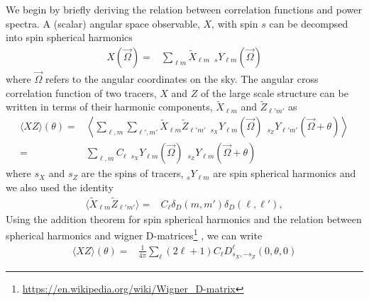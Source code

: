 \documentclass[\docopts]{\docclass}
\begin{document}
We begin by briefly deriving the relation between correlation functions and power spectra.
A (scalar) angular space observable, $X$, with spin $s$ can be decompsed into spin spherical
harmonics
\begin{align}\label{eq:X_harmonic}
  X(\vec \Omega)=&\sum_{\ell m}\tilde X_{\ell m} {\hspace{5pt}}_sY_{\ell m}(\vec \Omega)
\end{align}
where $\vec \Omega$ refers to the angular coordinates on the sky.
The angular cross correlation function of two tracers, $X$ and $Z$ of the large scale
structure can be written in terms of their harmonic components, $\tilde X_{\ell m}$ and $\tilde Z_{\ell' m'}$ as
\begin{align}
  \langle XZ \rangle(\theta)=&\left\langle\sum_{\ell,m}\sum_{\ell', m'}\tilde X_{\ell m}\tilde
  Z_{\ell' m'}{\hspace{5pt}}_{s_X}Y_{\ell m}(\vec \Omega){\hspace{5pt}}_{s_Z}Y_{\ell'm'}(\vec \Omega+\theta)\right\rangle\\
  =&\sum_{\ell,m}C_{\ell}{\hspace{5pt}}_{s_X}Y_{\ell m}(\vec \Omega){\hspace{5pt}}_{s_Z}Y_{\ell m}(\vec \Omega+\theta)%
\end{align}
where $s_X$ and $s_Z$ are the spins of tracers, $_{s}Y_{\ell m}$ are spin spherical harmonics and
we also used the identity
\begin{align}
  \langle\tilde X_{\ell m}\tilde Z_{\ell' m'}\rangle=&C_{\ell}\delta_D(m,m')\delta_D(\ell,\ell'),
\end{align}
Using the addition theorem for spin spherical harmonics and the relation between spherical
harmonics and wigner D-matrices\footnote{\url{https://en.wikipedia.org/wiki/Wigner_D-matrix}}
\citep{Ng1999}, we can write
\begin{align}
  \langle XZ
  \rangle(\theta)=&\frac{1}{4\pi}\sum_{\ell}(2\ell+1)C_{\ell}D^{\ell}_{s_X,-s_Z}(0,\theta,0)
\end{align}
\end{document}
